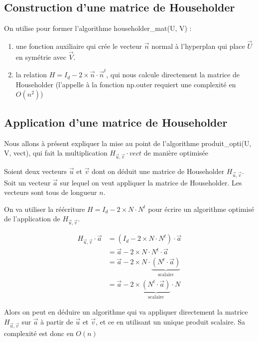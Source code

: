 \documentclass{article}
\begin{document}
\subsection{Construction d'une matrice de Householder}
\label{ssec:construc_householder}

  On utilise pour former l'algorithme householder\_mat(U, V) :
  \begin{enumerate}
    \item une fonction auxiliaire qui crée le vecteur $\vec{n}$ normal à l'hyperplan qui place $\vec{U}$ en symétrie avec $\vec{V}$.
    \item la relation $H = I_d - 2 \times \vec{n} \cdot \vec{n}^t$, qui nous calcule directement la matrice de Householder (l'appelle à la fonction np.outer requiert
    une complexité en $O(n^2)$)
  \end{enumerate}

\subsection{Application d'une matrice de Householder}
\label{ssec:appli_householder}

Nous allons à présent expliquer la mise au point de l'algorithme produit\_opti(U, V, vect), qui fait la multiplication
$H_{\vec{u},\vec{v}} \cdot vect$ de manière optimisée

Soient deux vecteurs $\vec{u}$ et $\vec{v}$ dont on déduit une matrice de Householder $H_{\vec{u},\vec{v}}$.
Soit un vecteur $\vec{a}$ sur lequel on veut appliquer la matrice de Householder. Les vecteurs sont tous de longueur $n$.

On va utiliser la réécriture $H = I_d - 2 \times N \cdot N^t$ pour écrire un algorithme optimisé de l'application
de $H_{\vec{u},\vec{v}}$.

\begin{align}
  \label{eq:opti_app_hh}
  H_{\vec{u},\vec{v}} \cdot \vec{a} &= (I_d - 2 \times N \cdot N^t) \cdot \vec{a} \\
                                    &= \vec{a} - 2 \times N \cdot N^t \cdot \vec{a} \\
                                    &= \vec{a} - 2 \times N \cdot \underbrace{(N^t \cdot \vec{a})}_{\text{scalaire}} \\
                                    &= \vec{a} - 2 \times \underbrace{(N^t \cdot \vec{a})}_{\text{scalaire}} \cdot N
\end{align}

Alors on peut en déduire un algorithme qui va appliquer directement la matrice $H_{\vec{u},\vec{v}}$ sur $\vec{a}$ à
partir de $\vec{u}$ et $\vec{v}$, et ce en utilisant un unique produit scalaire. Sa complexité est donc en $O(n)$
\end{document}
